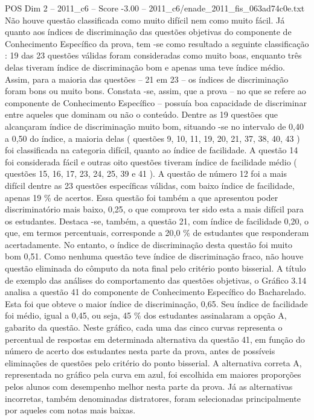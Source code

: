 \begin{textsample}{POS Dim 2 – 2011\_c6 – Score -3.00 – 2011\_c6/enade\_2011\_fis\_063ad74c0e.txt}
Não houve questão classificada como muito difícil nem como muito fácil.
Já quanto aos índices de discriminação das questões objetivas do componente de Conhecimento Específico da prova, tem -se como resultado a seguinte classificação : 19 das 23 questões válidas foram consideradas como muito boas, enquanto três delas tiveram índice de discriminação bom e apenas uma teve índice médio.
Assim, para a maioria das questões – 21 em 23 – os índices de discriminação foram bons ou muito bons.
Constata -se, assim, que a prova – no que se refere ao componente de Conhecimento Específico – possuía boa capacidade de discriminar entre aqueles que dominam ou não o conteúdo.
Dentre as 19 questões que alcançaram índice de discriminação muito bom, situando -se no intervalo de 0,40 a 0,50 do índice, a maioria delas ( questões 9, 10, 11, 19, 20, 21, 37, 38, 40, 43 ) foi classificada na categoria difícil, quanto ao índice de facilidade.
A questão 14 foi considerada fácil e outras oito questões tiveram índice de facilidade médio ( questões 15, 16, 17, 23, 24, 25, 39 e 41 ).
A questão de número 12 foi a mais difícil dentre as 23 questões específicas válidas, com baixo índice de facilidade, apenas 19 \% de acertos.
Essa questão foi também a que apresentou poder discriminatório mais baixo, 0,25, o que comprova ter sido esta a mais difícil para os estudantes.
Destaca -se, também, a questão 21, com índice de facilidade 0,20, o que, em termos percentuais, corresponde a 20,0 \% de estudantes que responderam acertadamente.
No entanto, o índice de discriminação desta questão foi muito bom 0,51.
Como nenhuma questão teve índice de discriminação fraco, não houve questão eliminada do cômputo da nota final pelo critério ponto bisserial.
A título de exemplo das análises do comportamento das questões objetivas, o Gráfico 3.14 analisa a questão 41 do componente de Conhecimento Específico do Bacharelado.
Esta foi que obteve o maior índice de discriminação, 0,65.
Seu índice de facilidade foi médio, igual a 0,45, ou seja, 45 \% dos estudantes assinalaram a opção A, gabarito da questão.
Neste gráfico, cada uma das cinco curvas representa o percentual de respostas em determinada alternativa da questão 41, em função do número de acerto dos estudantes nesta parte da prova, antes de possíveis eliminações de questões pelo critério do ponto bisserial.
A alternativa correta A, representada no gráfico pela curva em azul, foi escolhida em maiores proporções pelos alunos com desempenho melhor nesta parte da prova.
Já as alternativas incorretas, também denominadas distratores, foram selecionadas principalmente por aqueles com notas mais baixas.

\end{textsample}
